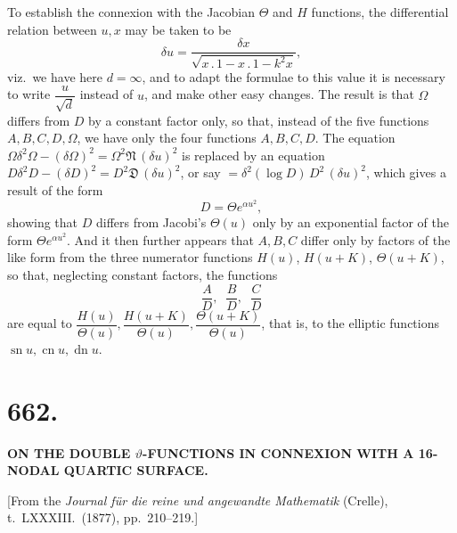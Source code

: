 \documentclass[11pt,a4paper]{article}
\providecommand{\sn}{\operatorname{sn}}
\providecommand{\cn}{\operatorname{cn}}
\providecommand{\dn}{\operatorname{dn}}
\begin{document}
To establish the connexion with the Jacobian $\Theta$ and $H$ functions, the differential relation between $u, x$ may be taken to be
\[
\delta u = \frac{\delta x}{\sqrt{x\,.\,1 - x\,.\,1 - k^{2}x}},
\]
viz.\ we have here $d = \infty$, and to adapt the formulae to this value it is necessary to write $\dfrac{u}{\sqrt{d}}$ instead of $u$, and make other easy changes. The result is that $\Omega$ differs from $D$ by a constant factor only, so that, instead of the five functions $A, B, C, D, \Omega$, we have only the four functions $A, B, C, D$. The equation $\Omega\delta^{2}\Omega - (\delta\Omega)^{2} = \Omega^{2}\mathfrak{N}\,(\delta u)^{2}$ is replaced by an equation $D\delta^{2}D - (\delta D)^{2} = D^{2}\mathfrak{D}\,(\delta u)^{2}$, or say $= \delta^{2}(\log D)\,D^{2}\,(\delta u)^{2}$, which gives a result of the form
\[
D = \Theta e^{\alpha u^{2}},
\]
showing that $D$ differs from Jacobi's $\Theta(u)$ only by an exponential factor of the form $\Theta e^{\alpha u^{2}}$. And it then further appears that $A, B, C$ differ only by factors of the like form from the three numerator functions $H(u)$, $H(u + K)$, $\Theta(u + K)$, so that, neglecting constant factors, the functions
\[
\frac{A}{D},\;\;\frac{B}{D},\;\;\frac{C}{D}
\]
are equal to $\dfrac{H(u)}{\Theta(u)}, \dfrac{H(u + K)}{\Theta(u)}, \dfrac{\Theta(u + K)}{\Theta(u)}$, that is, to the elliptic functions $\sn u, \cn u, \dn u$.

\newpage



\section*{662.}

\begin{center}
\textbf{ON THE DOUBLE $\vartheta$-FUNCTIONS IN CONNEXION WITH A 16-NODAL QUARTIC SURFACE.}
\end{center}

\medskip

\begin{center}
[From the \emph{Journal f\"ur die reine und angewandte Mathematik} (Crelle), t.~LXXXIII.\ (1877), pp.~210--219.]
\end{center}

\medskip
\end{document}
